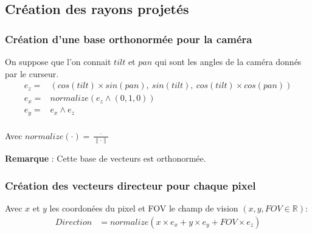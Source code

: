 \newpage
\subsection{Création des rayons projetés}
\subsubsection{Création d'une base orthonormée pour la caméra}

On suppose que l'on connait $tilt$ et $pan$ qui sont les angles de la caméra donnés par le curseur. 
\begin{align*}
    e_z =&  (cos(tilt)\times sin(pan) ,\ sin(tilt) ,\ cos(tilt)\times cos(pan))\\
    e_x =&  normalize(e_z \wedge (0,1,0) )\\
    e_y =& e_x \wedge e_z\\
\end{align*}

Avec $normalize(\cdot ) = \frac{\cdot }{\| \cdot  \|}$

\textbf{Remarque} : Cette base de vecteurs est orthonormée.
\subsubsection{Création des vecteurs directeur pour chaque pixel}
Avec $x$ et $y$ les coordonées du pixel et FOV le champ de vision $(x,y,FOV\in \mathbb{R})$: 
\begin{align*}
    Direction &= normalize(x\times e_x + y\times e_y + FOV\times e_z)\\
\end{align*}

